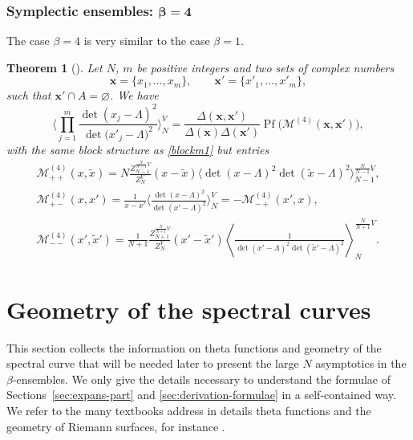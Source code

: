 \documentclass[10pt,a4paper]{amsart}
\numberwithin{equation}{section}
\newtheorem{Theorem}{Theorem}[section]
\newcommand{\mean}[1]{\left\langle{#1}\right\rangle}
\DeclareMathOperator{\pf}{Pf}
\begin{document}
\subsubsection[Symplectic ensembles: beta = 4]{Symplectic ensembles: $\boldsymbol{\beta = 4}$}
The case $\beta = 4$ is very similar to the case $\beta = 1$.

\begin{Theorem}[{\cite[Theorem 1.2.1]{borodin_averages}}]
 \label{th:idbeta4} Let $N$, $m$ be positive integers and two sets of complex numbers
\[
\bm{x} = \{x_{1}, \ldots, x_{m}\},\qquad \bm{x}' = \{x'_{1}, \ldots, x'_{m}\},
\]
 such that $\bm{x}' \cap A= \varnothing$. We have
 \begin{equation*}%
 \Biggl\langle\prod_{j=1}^{m}\frac{\det(x_{j} - \Lambda)^{2}}{\det\big(x'_{j} - \Lambda\big)^{2}}\Biggr\rangle_{N}^{V}
 = \frac{\Delta(\bm{x},\bm{x}')}{\Delta(\bm{x})\Delta(\bm{x}')}\pf\bigl(\mathcal{M}^{(4)}(\bm{x},\bm{x}')\bigr),
 \end{equation*}
 with the same block structure as \eqref{blockm1} but entries
 \begin{gather*}%
 \mathcal{M}^{(4)}_{++}(x,\tilde{x}) = N\frac{Z^{\frac{N}{N-1}V}_{N-1}}{Z^{V}_{N}}(x- \tilde{x})\bigl\langle\det(x - \Lambda)^{2}\det(\tilde{x} - \Lambda)^{2}\bigr\rangle^{\frac{N}{N - 1}V}_{N-1},\\
 \mathcal{M}^{(4)}_{+-}(x,x')  = \frac{1}{x-x'}\Biggl\langle\frac{\det(x - \Lambda)^{2}}{\det(x' - \Lambda)^{2}}\Biggr\rangle^{V}_{N} = -\mathcal{M}^{(4)}_{-+}(x',x), \\
 \mathcal{M}^{(4)}_{--}(x',\tilde{x}') = \frac{1}{N+1}\frac{Z^{\frac{N}{N+1}V}_{N+1}}{Z^{V}_{N}}(x'- \tilde{x}')\mean{\frac{1}{\det(x' - \Lambda)^{2}\det(\tilde{x}' - \Lambda)^{2}}}^{\frac{N}{N+1}V}_{N}.
 \end{gather*}
\end{Theorem}

\section{Geometry of the spectral curves}%

This section collects the information on theta functions and geometry of the spectral curve that will be needed later to present the large $N$ asymptotics in the $\beta$-ensembles. We only give the details necessary to understand the formulae of Sections~\ref{sec:expans-part} and \ref{sec:derivation-formulae} in a self-contained way. We refer to the many textbooks address in details theta functions and the geometry of Riemann surfaces, for instance \cite{Bertolac,Farkas-Kra, Fay,Tata1}.
\end{document}
